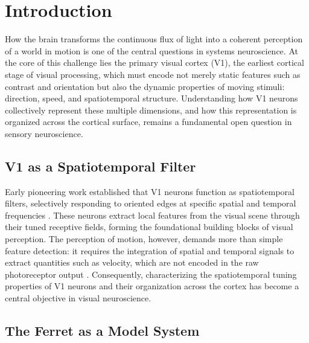 \documentclass{brandeis-thesis3.3}
\begin{document}
\chapter[Introduction]{Introduction}
How the brain transforms the continuous flux of light into a coherent
perception of a world in motion is one of the central questions in
systems neuroscience. At the core of this challenge lies the primary
visual cortex (V1), the earliest cortical stage of visual processing,
which must encode not merely static features such as contrast and
orientation but also the dynamic properties of moving stimuli:
direction, speed, and spatiotemporal structure. Understanding how V1
neurons collectively represent these multiple dimensions, and how this
representation is organized across the cortical surface, remains a
fundamental open question in sensory neuroscience.

\section{V1 as a Spatiotemporal Filter}

Early pioneering work established that V1 neurons function as
spatiotemporal filters, selectively responding to oriented edges at
specific spatial and temporal frequencies \citep{Hubel1962,
Albrecht1981}. These neurons extract local features from the visual
scene through their tuned receptive fields, forming the foundational
building blocks of visual perception. The perception of motion,
however, demands more than simple feature detection: it requires the
integration of spatial and temporal signals to extract quantities such
as velocity, which are not encoded in the raw photoreceptor output
\citep{Adelson1985}. Consequently, characterizing the spatiotemporal
tuning properties of V1 neurons and their organization across the
cortex has become a central objective in visual neuroscience.

\section{The Ferret as a Model System}
\end{document}
